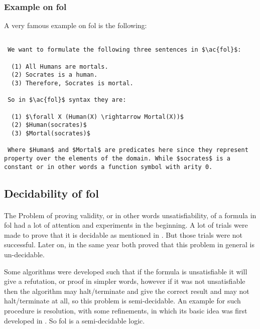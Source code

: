 \subsubsection{Example on \ac{fol}}
A very famous example on \ac{fol} is the following:
\begin{lstlisting}[caption=Example on \ac{fol},mathescape,breaklines=true,frame=single]

 We want to formulate the following three sentences in $\ac{fol}$:

  (1) All Humans are mortals.
  (2) Socrates is a human.
  (3) Therefore, Socrates is mortal.
  
 So in $\ac{fol}$ syntax they are:

  (1) $\forall X (Human(X) \rightarrow Mortal(X))$
  (2) $Human(socrates)$
  (3) $Mortal(socrates)$
  
 Where $Human$ and $Mortal$ are predicates here since they represent property over the elements of the domain. While $socrates$ is a constant or in other words a function symbol with arity 0. 

\end{lstlisting}



\subsection{Decidability of \ac{fol}}
\paragraph{}
The Problem of proving validity, or in other words unsatisfiability, of a formula in \acf{fol} had a lot of attention and experiments in the beginning. A lot of trials were made to prove that it is decidable as mentioned in \cite{SL_14}. But those trials were not successful. Later on, in the same year both \cite{DEC_TUR, DEC_CHURCH} proved that this problem in general is un-decidable.


Some algorithms were developed such that if the formula is unsatisfiable it will give a refutation, or proof in simpler words, however if it was not unsatisfiable then the algorithm may halt/terminate and give the correct result and may not halt/terminate at all, so this problem is semi-decidable. An example for such procedure is resolution, with some refinements, in which its basic idea was first developed in \cite{RES_65}. So \acf{fol} is a semi-decidable logic.



